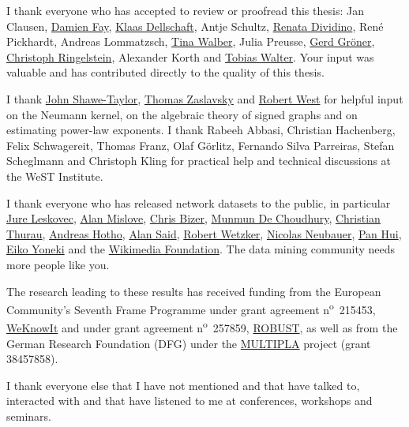 \documentclass[11pt,a4paper]{book}
\begin{document}
\begin{spacing}{1.3}
I thank everyone who has accepted to review or proofread this thesis:
Jan Clausen, \href{http://www.cl.cam.ac.uk/~df276/}{Damien
  Fay},
\href{http://www.uni-koblenz-landau.de/koblenz/fb4/AGStaab/Persons/Dellschaft}{Klaas
  Dellschaft},
Antje Schultz,
\href{http://www.uni-koblenz-landau.de/koblenz/fb4/AGStaab/Persons/renata-dividino}{Renata
  Dividino},
René Pickhardt,
Andreas Lommatzsch,
\href{http://www.uni-koblenz-landau.de/koblenz/fb4/AGStaab/Persons/Walber/}{Tina
  Walber},
Julia Preusse,
\href{http://www.uni-koblenz-landau.de/koblenz/fb4/AGStaab/Persons/Groener}{Gerd
  Gröner},
\href{http://www.uni-koblenz-landau.de/koblenz/fb4/AGStaab/Persons/Ringelstein}{Christoph
  Ringelstein},
Alexander Korth and
\href{http://walter.semanticsoftware.eu/}{Tobias Walter}. 
Your input was valuable and has contributed directly to the quality of
this thesis. 

I thank \href{http://www.cs.ucl.ac.uk/staff/j.shawe-taylor/}{John
  Shawe-Taylor},
\href{http://www.math.binghamton.edu/zaslav/}{Thomas Zaslavsky} 
and
\href{http://ai.stanford.edu/~west1/}{Robert West}
for helpful input on the Neumann kernel, on the algebraic theory of
signed graphs and on estimating power-law exponents. 
I thank Rabeeh Abbasi, Christian Hachenberg, Felix
Schwagereit, Thomas Franz, Olaf Görlitz, Fernando Silva
Parreiras, Stefan Scheglmann and Christoph
Kling for practical help and technical discussions at the WeST 
Institute. 

I thank everyone who has released network datasets to the public, in
particular \href{http://cs.stanford.edu/people/jure/}{Jure Leskovec},
\href{http://www.ccs.neu.edu/home/amislove/}{Alan Mislove},
\href{http://www.wiwiss.fu-berlin.de/en/institute/pwo/bizer/}{Chris
  Bizer}, \href{http://www.public.asu.edu/~mdechoud/}{Munmun De  
  Choudhury}, \href{http://cthurau.fargonauten.de/}{Christian Thurau},
\href{http://www.is.informatik.uni-wuerzburg.de/staff/hotho/}{Andreas
  Hotho}, \href{http://alansaid.com/}{Alan Said}, \href{http://robertwetzker.com/}{Robert
Wetzker}, \href{http://www.nicolasneubauer.net/}{Nicolas Neubauer},
\href{http://www.net.t-labs.tu-berlin.de/~ben/}{Pan Hui},
\href{http://www.cl.cam.ac.uk/~ey204/}{Eiko Yoneki} and the 
\href{http://wikimediafoundation.org/}{Wikimedia Foundation}.  The data
mining community needs more people like you. 

The research leading to these results has received funding from the
European Community's Seventh Frame Programme under grant agreement
n\textsuperscript{o}~215453, \href{http://www.weknowit.eu/}{WeKnowIt}
and under grant agreement
n\textsuperscript{o}~257859, \href{http://robust-project.eu/}{ROBUST},
as well as from the German Research
Foundation (DFG) under the
\href{http://www.multipla-project.org/}{MULTIPLA} project (grant
38457858).   

I thank everyone else that I have not mentioned and that have talked to,
interacted with and that have listened to me at conferences, workshops and
seminars. 

\end{spacing}
\end{document}
